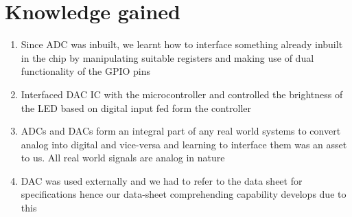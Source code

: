 \documentclass[12pt, letterpaper]{article}
\begin{document}
\newpage

\section{Knowledge gained}

\begin{enumerate}
	\item Since ADC was inbuilt, we learnt how to interface something already inbuilt in the chip by manipulating suitable registers and making use of dual functionality of the GPIO pins
	
	\item Interfaced DAC IC with the microcontroller and controlled the brightness of the LED based on digital input fed form the controller 
	
	\item ADCs and DACs form an integral part of any real world systems to convert analog into digital and vice-versa and learning to interface them was an asset to us. All real world signals are analog in nature
	
	\item DAC was used externally and we had to refer to the data sheet for specifications hence our data-sheet comprehending capability develops due to this
\end{enumerate}
\end{document}
